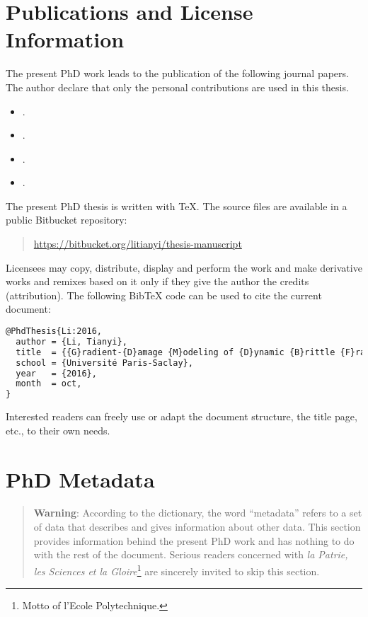 \section*{Publications and License Information}
The present PhD work leads to the publication of the following journal papers. The author declare that only the personal contributions are used in this thesis.
\begin{itemize}
\item {}. 
\item {}. 
\item {}. 
\item {}. 
\end{itemize}

The present PhD thesis is written with \TeX. The source files are available in a public Bitbucket repository:
\begin{quotation}
\url{https://bitbucket.org/litianyi/thesis-manuscript}
\end{quotation}

\doclicenseThis

Licensees may copy, distribute, display and perform the work and make derivative works and remixes based on it only if they give the author the credits (attribution). The following BibTeX code can be used to cite the current document:
\begin{lstlisting}[language=TeX]
@PhdThesis{Li:2016,
  author = {Li, Tianyi},
  title  = {{G}radient-{D}amage {M}odeling of {D}ynamic {B}rittle {F}racture: {V}ariational {P}rinciples and {N}umerical {S}imulations},
  school = {Université Paris-Saclay},
  year   = {2016},
  month  = oct,
}
\end{lstlisting}

Interested readers can freely use or adapt the document structure, the title page, etc., to their own needs.

\section*{PhD Metadata}
\begin{quotation}
\textbf{Warning}: According to the dictionary, the word ``metadata'' refers to a set of data that describes and gives information about other data. This section provides information behind the present PhD work and has nothing to do with the rest of the document. Serious readers concerned with \emph{la Patrie, les Sciences et la Gloire}\footnote{Motto of l'Ecole Polytechnique.} are sincerely invited to skip this section.
\end{quotation}

